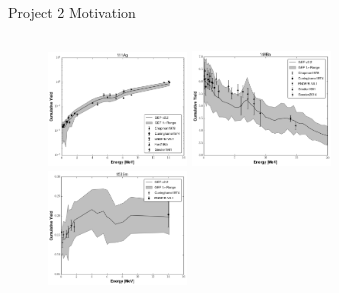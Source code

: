 \documentclass[xcolor=x11names,compress]{beamer}
\renewcommand{\(}{\begin{columns}}
\renewcommand{\)}{\end{columns}}
\newcommand{\<}[1]{\begin{column}{#1}}
\renewcommand{\>}{\end{column}}
\begin{document}
\begin{frame}{Project 2 Motivation}
\begin{columns}
    \begin{column}{0.45\linewidth}
      \vspace{-0.55cm}
      \renewcommand*{\thesubfigure}{}
      \begin{figure}[htp]
        \centering
        \includegraphics[width=1.45in]{../figs/47_111_Ag_log.png}
        \vspace{-0.35cm}
        \includegraphics[width=1.45in]{../figs/56_140_Ba_lin.png}
        \vspace{-0.5cm}
        \includegraphics[width=1.45in]{../figs/62_153_Sm_lin.png}
      \end{figure}    
    \end{column}
  \end{columns}   
\end{frame}
\end{document}
